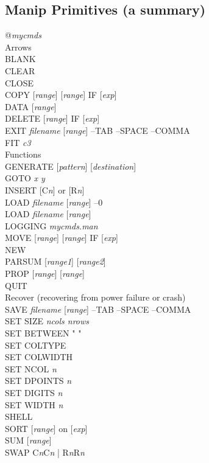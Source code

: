 \subsection{Manip Primitives (a summary)}
%
%
{\sf @{\it mycmds}}\\
{\sf Arrows}\\
{\sf BLANK}\\
{\sf CLEAR}\\
{\sf CLOSE}\\
{\sf COPY [{\it range}] [{\it range}] IF [{\it exp}]}\\
{\sf DATA [{\it range}]}\\
{\sf DELETE [{\it range}] IF [{\it exp}]}\\
{\sf EXIT {\it filename} [{\it range}] --TAB --SPACE --COMMA}\\
{\sf FIT {\it c3}}\\
{\sf Functions}\\
{\sf GENERATE [{\it pattern}] [{\it destination}]}\\
{\sf GOTO {\it x y}}\\
{\sf INSERT [C{\it n}] or [R{\it n}]}\\
{\sf LOAD {\it filename} [{\it range}] --0}\\
{\sf LOAD {\it filename} [{\it range}]}\\
{\sf LOGGING {\it mycmds.man}}\\
{\sf MOVE [{\it range}] [{\it range}] IF [{\it exp}]}\\
{\sf NEW}\\
{\sf PARSUM [{\it range1}] [{\it range2}]}\\
{\sf PROP [{\it range}] [{\it range}]}\\
{\sf QUIT}\\
{\sf Recover (recovering from power failure or crash)}\\
{\sf SAVE {\it filename} [{\it range}] --TAB --SPACE --COMMA}\\
{\sf SET SIZE {\it ncols nrows} }\\
{\sf SET BETWEEN "  "}\\
{\sf SET COLTYPE}\\ 
{\sf SET COLWIDTH}\\
{\sf SET NCOL {\it n}}\\
{\sf SET DPOINTS {\it n}}\\
{\sf SET DIGITS {\it n}}\\
{\sf SET WIDTH {\it n}}\\
{\sf SHELL}\\
{\sf SORT [{\it range}] on [{\it exp}]}\\
{\sf SUM [{\it range}]}\\
{\sf SWAP C{\it n}C{\it n} | R{\it n}R{\it n}}


